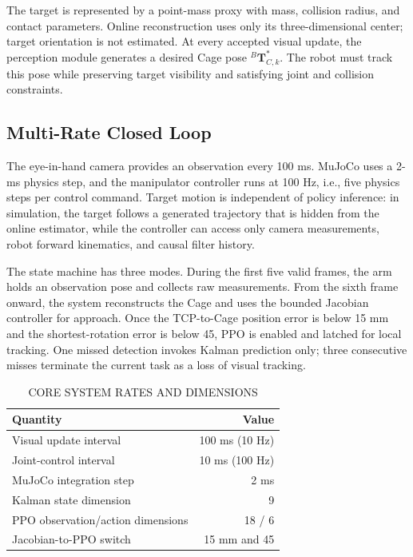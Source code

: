 \documentclass[conference]{IEEEtran}
\begin{document}
The target is represented by a point-mass proxy with mass, collision radius, and contact parameters. Online reconstruction uses only its three-dimensional center; target orientation is not estimated. At every accepted visual update, the perception module generates a desired Cage pose \({}^{B}\mathbf{T}_{C,k}^{*}\). The robot must track this pose while preserving target visibility and satisfying joint and collision constraints.

\subsection{Multi-Rate Closed Loop}

The eye-in-hand camera provides an observation every 100 ms. MuJoCo uses a 2-ms physics step, and the manipulator controller runs at 100 Hz, i.e., five physics steps per control command. Target motion is independent of policy inference: in simulation, the target follows a generated trajectory that is hidden from the online estimator, while the controller can access only camera measurements, robot forward kinematics, and causal filter history.

The state machine has three modes. During the first five valid frames, the arm holds an observation pose and collects raw measurements. From the sixth frame onward, the system reconstructs the Cage and uses the bounded Jacobian controller for approach. Once the TCP-to-Cage position error is below 15 mm and the shortest-rotation error is below 45\textdegree{}, PPO is enabled and latched for local tracking. One missed detection invokes Kalman prediction only; three consecutive misses terminate the current task as a loss of visual tracking.

\begin{table}[t]
\caption{CORE SYSTEM RATES AND DIMENSIONS}
\centering
\footnotesize
\begin{tabular}{lr}
\toprule
Quantity & Value \\
\midrule
Visual update interval & 100 ms (10 Hz) \\
Joint-control interval & 10 ms (100 Hz) \\
MuJoCo integration step & 2 ms \\
Kalman state dimension & 9 \\
PPO observation/action dimensions & 18 / 6 \\
Jacobian-to-PPO switch & 15 mm and 45\textdegree{} \\
\bottomrule
\end{tabular}
\end{table}
\end{document}
